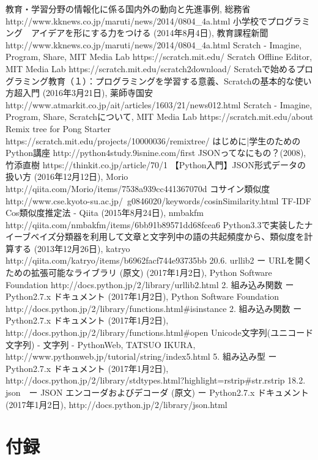 \documentclass[a4paper,10pt,onecolumn,oneside,openany]{jsbook}
\begin{document}
\begin{thebibliography}{19}

教育・学習分野の情報化に係る国内外の動向と先進事例, 総務省 http://www.kknews.co.jp/maruti/news/2014/0804\_4a.html
小学校でプログラミング　アイデアを形にする力をつける (2014年8月4日), 教育課程新聞 http://www.kknews.co.jp/maruti/news/2014/0804\_4a.html
Scratch - Imagine, Program, Share, MIT Media Lab https://scratch.mit.edu/
Scratch Offline Editor, MIT Media Lab https://scratch.mit.edu/scratch2download/
Scratchで始めるプログラミング教育（１）：プログラミングを学習する意義、Scratchの基本的な使い方超入門 (2016年3月21日), 薬師寺国安 http://www.atmarkit.co.jp/ait/articles/1603/21/news012.html
Scratch - Imagine, Program, Share, Scratchについて, MIT Media Lab https://scratch.mit.edu/about
Remix tree for Pong Starter https://scratch.mit.edu/projects/10000036/remixtree/
はじめに|学生のためのPython講座 http://python4study.9isnine.com/first
JSONってなにもの？(2008), 竹添直樹 https://thinkit.co.jp/article/70/1
【Python入門】JSON形式データの扱い方 (2016年12月12日), Morio http://qiita.com/Morio/items/7538a939cc441367070d
 コサイン類似度 http://www.cse.kyoto-su.ac.jp/~g0846020/keywords/cosinSimilarity.html
 TF-IDF Cos類似度推定法 - Qiita (2015年8月24日), nmbakfm http://qiita.com/nmbakfm/items/6bb91b89571dd68fcea6
 Python3.3で実装したナイーブベイズ分類器を利用して文章と文字列中の語の共起頻度から、類似度を計算する (2013年12月26日), katryo http://qiita.com/katryo/items/b6962facf744e93735bb
 20.6. urllib2 ー URLを開くための拡張可能なライブラリ (原文) (2017年1月2日), Python Software Foundation http://docs.python.jp/2/library/urllib2.html
 2. 組み込み関数 ー Python2.7.x ドキュメント (2017年1月2日), Python Software Foundation http://docs.python.jp/2/library/functions.html\#isinstance
 2. 組み込み関数 ー Python2.7.x ドキュメント (2017年1月2日), http://docs.python.jp/2/library/functions.html\#open
 Unicode文字列(ユニコード文字列) - 文字列 - PythonWeb, TATSUO IKURA, http://www.pythonweb.jp/tutorial/string/index5.html
 5. 組み込み型 ー Python2.7.x ドキュメント (2017年1月2日), http://docs.python.jp/2/library/stdtypes.html?highlight=rstrip\#str.rstrip
 18.2. json　ー JSON エンコーダおよびデコーダ (原文) ー Python2.7.x ドキュメント (2017年1月2日), http://docs.python.jp/2/library/json.html

\end{thebibliography}

\chapter{付録}

\newpage

\newpage




\newpage
\printindex
%
%
\end{document}
